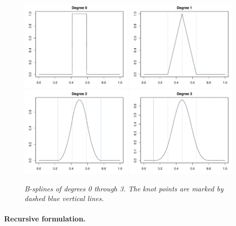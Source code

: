 \documentclass{article}
\begin{document}
\begin{figure}[tb]
\centering
\includegraphics[width=0.475\textwidth]{bs0.pdf} 
\includegraphics[width=0.475\textwidth]{bs1.pdf} 
\includegraphics[width=0.475\textwidth]{bs2.pdf} 
\includegraphics[width=0.475\textwidth]{bs3.pdf} 
\caption{\it B-splines of degrees 0 through 3. The knot points are marked by
  dashed blue vertical lines.}
\label{fig:bs}
\end{figure}

\paragraph{Recursive formulation.} 
\end{document}
